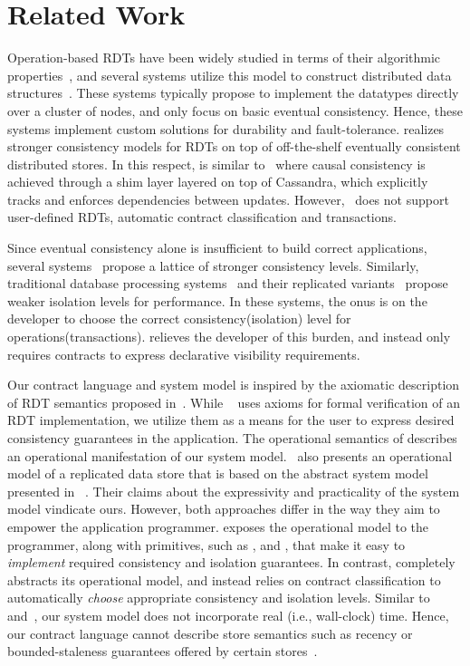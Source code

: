 \section{Related Work}
\label{sec:related}

Operation-based RDTs have been widely studied in terms of their algorithmic
properties~\cite{SSS,Burckhardt2014}, and several systems utilize this model to
construct distributed data structures~\cite{Cassandra,Bayou,Tango}. These
systems typically propose to implement the datatypes directly over a cluster of
nodes, and only focus on basic eventual consistency. Hence, these systems
implement custom solutions for durability and fault-tolerance. \name realizes
stronger consistency models for RDTs on top of off-the-shelf eventually consistent
distributed stores. In this respect, \name is similar to~\cite{BoltOn} where
causal consistency is achieved through a shim layer layered on top of Cassandra, which
explicitly tracks and enforces dependencies between updates.
However,~\cite{BoltOn} does not support user-defined RDTs, automatic contract
classification and transactions.

Since eventual consistency alone is insufficient to build correct applications,
several systems~\cite{Bayou,Pileus,RedBlue} propose a lattice of stronger
consistency levels. Similarly, traditional database processing
systems~\cite{Berenson95} and their replicated variants~\cite{BailisHAT}
propose weaker isolation levels for performance. In these systems, the onus is
on the developer to choose the correct consistency(isolation) level for
operations(transactions). \name relieves the developer of this burden, and
instead only requires contracts to express declarative visibility requirements.

Our contract language and system model is inspired by the axiomatic description
of RDT semantics proposed in~\cite{Burckhardt2014}. While ~\cite{Burckhardt2014}
uses axioms for formal verification of an RDT implementation, we utilize them as
a means for the user to express desired consistency guarantees in the
application. The operational semantics of \name describes an operational
manifestation of our system model.~\cite{Burckhardt2015} also presents an
operational model of a replicated data store that is based on the abstract
system model presented in ~\cite{Burckhardt2014}. Their claims about the
expressivity and practicality of the system model vindicate ours. However, both
approaches differ in the way they aim to empower the application programmer.
\cite{Burckhardt2015} exposes the operational model to the programmer, along
with primitives, such as ,  and , that make it easy
to \emph{implement} required consistency and isolation guarantees. In contrast,
\name completely abstracts its operational model, and instead relies on contract
classification to automatically \emph{choose} appropriate consistency and
isolation levels.  Similar to~\cite{Burckhardt2014} and~\cite{Burckhardt2015},
our system model does not incorporate real (i.e., wall-clock) time. Hence, our
contract language cannot describe store semantics such as recency or
bounded-staleness guarantees offered by certain stores~\cite{Pileus}.

